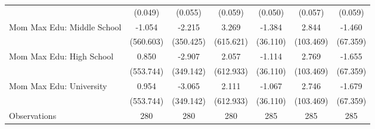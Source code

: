 {\begin{tabular}{l*{6}{c}}
                    &     (0.049)         &     (0.055)         &     (0.059)         &     (0.050)         &     (0.057)         &     (0.059)         \\
\addlinespace
Mom Max Edu: Middle School&      -1.054         &      -2.215         &       3.269         &      -1.384         &       2.844         &      -1.460         \\
                    &   (560.603)         &   (350.425)         &   (615.621)         &    (36.110)         &   (103.469)         &    (67.359)         \\
\addlinespace
Mom Max Edu: High School&       0.850         &      -2.907         &       2.057         &      -1.114         &       2.769         &      -1.655         \\
                    &   (553.744)         &   (349.142)         &   (612.933)         &    (36.110)         &   (103.469)         &    (67.359)         \\
\addlinespace
Mom Max Edu: University&       0.954         &      -3.065         &       2.111         &      -1.067         &       2.746         &      -1.679         \\
                    &   (553.744)         &   (349.142)         &   (612.933)         &    (36.110)         &   (103.469)         &    (67.359)         \\
\midrule
Observations        &         280         &         280         &         280         &         285         &         285         &         285         \\
\bottomrule
\end{tabular}
}
